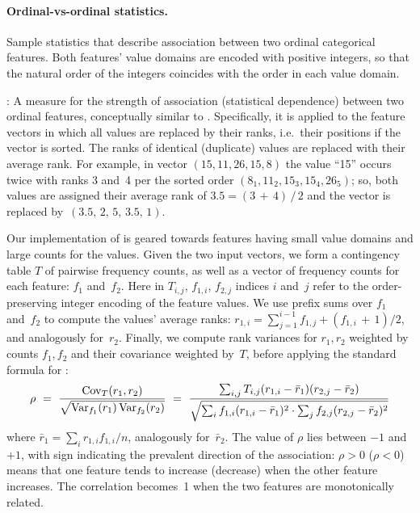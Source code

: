 \paragraph{Ordinal-vs-ordinal statistics.}
Sample statistics that describe association between two ordinal categorical features.
Both features' value domains are encoded with positive integers, so that the natural
order of the integers coincides with the order in each value domain.
\begin{Description}
\item[\it\NameStatRho]:
A measure for the strength of association (statistical dependence) between
two ordinal features, conceptually similar to \NameStatR.  Specifically, it is \NameStatR{}
applied to the feature vectors in which all values are replaced by their ranks, i.e.\ 
their positions if the vector is sorted.  The ranks of identical (duplicate) values
are replaced with their average rank.  For example, in vector
$(15, 11, 26, 15, 8)$ the value ``15'' occurs twice with ranks 3 and~4 per the sorted
order $(8_1, 11_2, 15_3, 15_4, 26_5)$; so, both values are assigned their average
rank of $3.5 = (3\,{+}\,4)\,{/}\,2$ and the vector is replaced by~$(3.5,\, 2,\, 5,\, 3.5,\, 1)$.

Our implementation of \NameStatRho{} is geared towards features having small value domains
and large counts for the values.  Given the two input vectors, we form a contingency table $T$
of pairwise frequency counts, as well as a vector of frequency counts for each feature: $f_1$
and~$f_2$.  Here in $T_{i,j}$, $f_{1,i}$, $f_{2,j}$ indices $i$ and~$j$ refer to the
order-preserving integer encoding of the feature values.
We use prefix sums over $f_1$ and~$f_2$ to compute the values' average ranks:
$r_{1,i} = \sum_{j=1}^{i-1} f_{1,j} + (f_{1,i}\,{+}\,1){/}2$, and analogously for~$r_2$.
Finally, we compute rank variances for $r_1, r_2$ weighted by counts $f_1, f_2$ and their
covariance weighted by~$T$, before applying the standard formula for \NameStatR:
\begin{equation*}
\rho \,\,=\,\, \frac{\Cov_T(r_1, r_2)}{\sqrt{\Var_{f_1}(r_1)\Var_{f_2}(r_2)}}
\,\,=\,\, \frac{\sum_{i,j} T_{i,j} (r_{1,i} - \bar{r}_1) (r_{2,j} - \bar{r}_2)}%
{\sqrt{\sum_i f_{1,i} (r_{1,i} - \bar{r}_1)^{2\mathstrut} \cdot \sum_j f_{2,j} (r_{2,j} - \bar{r}_2)^{2\mathstrut}}}
\end{equation*}
where $\bar{r}_1 = \sum_i r_{1,i} f_{1,i}{/}n$, analogously for~$\bar{r}_2$.
The value of $\rho$ lies between $-1$ and $+1$, with sign indicating the prevalent direction
of the association: $\rho > 0$ ($\rho < 0$) means that one feature tends to increase (decrease)
when the other feature increases.  The correlation becomes~1 when the two features are
monotonically related.
\end{Description}


